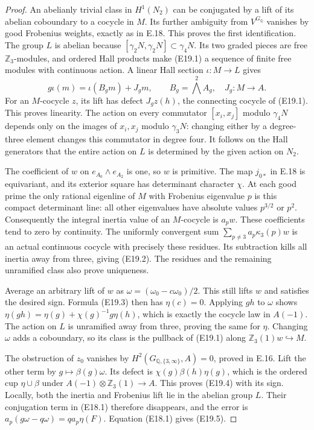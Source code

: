 \documentclass[11pt,oneside]{article}
\begin{document}
\begin{proof}
An abelianly trivial class in $H^1(N_2)$ can be
conjugated by a lift of its abelian coboundary to
a cocycle in $M$. Its further ambiguity from
$V^{G_{\mathbb Q}}$ vanishes by good Frobenius
weights, exactly as in E.18. This proves the
first identification. The group $L$ is abelian
because $[\gamma_2N,\gamma_2N]\subset\gamma_4N$.
Its two graded pieces are free $\mathbb Z_3$-modules,
and ordered Hall products make (E19.1) a sequence
of finite free modules with continuous action.
A linear Hall section $\iota:M\to L$ gives
\[
 g\iota(m)=\iota(B_gm)+J_gm,
       \qquad B_g=\bigwedge^2 A_g,
       \quad J_g:M\to A.
\]
For an $M$-cocycle $z$, its lift has defect
$J_gz(h)$, the connecting cocycle of (E19.1).
This proves linearity. The action on every
commutator $[x_i,x_j]$ modulo $\gamma_4N$
depends only on the images of $x_i,x_j$ modulo
$\gamma_3N$: changing either by a degree-three
element changes this commutator in degree four.
It follows on the Hall generators that the
entire action on $L$ is determined by the
given action on $N_2$.

The coefficient of $w$ on
$e_{A_0}\wedge e_{A_2}$ is one, so $w$ is primitive.
The map $j_{0*}$ in E.18 is equivariant, and its
exterior square has determinant character $\chi$.
At each good prime the only rational eigenline
of $M$ with Frobenius eigenvalue $p$ is this
compact determinant line: all other eigenvalues
have absolute values $p^{3/2}$ or $p^2$.
Consequently the integral inertia value of an
$M$-cocycle is $a_pw$. These coefficients tend
to zero by continuity. The uniformly convergent
sum $\sum_{p\ne3}a_p\kappa_3(p)w$ is an actual
continuous cocycle with precisely these residues.
Its subtraction kills all inertia away from
three, giving (E19.2). The residues and the
remaining unramified class also prove uniqueness.

Average an arbitrary lift of $w$ as
$\omega=(\omega_0-c\omega_0)/2$.
This still lifts $w$ and satisfies the desired
sign. Formula (E19.3) then has $\eta(c)=0$.
Applying $gh$ to $\omega$ shows
$\eta(gh)=\eta(g)+\chi(g)^{-1}g\eta(h)$,
which is exactly the cocycle law in $A(-1)$.
The action on $L$ is unramified away from
three, proving the same for $\eta$.
Changing $\omega$ adds a coboundary, so its
class is the pullback of (E19.1) along
$\mathbb Z_3(1)w\hookrightarrow M$.

The obstruction of $z_0$ vanishes by
$H^2(G_{\mathbb Q,\{3,\infty\}},A)=0$,
proved in E.16. Lift the other term by
$g\mapsto\beta(g)\omega$. Its defect is
$\chi(g)\beta(h)\eta(g)$, which is the
ordered cup $\eta\cup\beta$ under
$A(-1)\otimes\mathbb Z_3(1)\to A$.
This proves (E19.4) with its sign. Locally,
both the inertia and Frobenius lift lie in
the abelian group $L$. Their conjugation
term in (E18.1) therefore disappears, and
the error is
$a_p(g\omega-q\omega)=qa_p\eta(F)$.
Equation (E18.1) gives (E19.5).


\end{proof}
\end{document}

